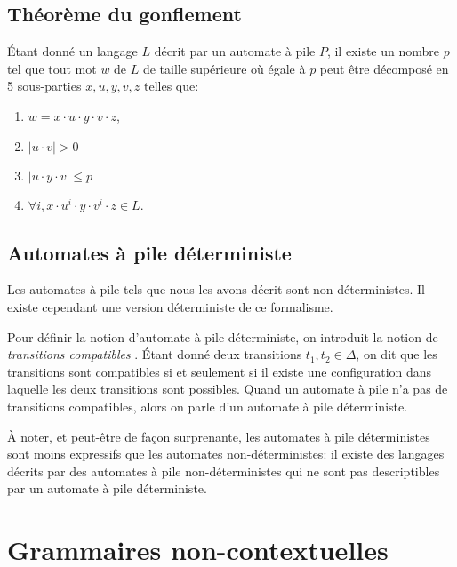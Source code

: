 \subsection{Théorème du gonflement}

Étant donné un langage $L$ décrit par un automate à pile $P$, il existe un nombre $p$ tel que tout mot $w$ de $L$ de taille supérieure où égale à $p$ peut être décomposé en 5 sous-parties $x, u, y, v, z$ telles que:
\begin{enumerate}
\item $w = x \cdot u \cdot y \cdot v \cdot z$,
\item $|u \cdot v| > 0$
\item $|u \cdot y \cdot v| \leq p$
\item $\forall i, x \cdot u^i \cdot y \cdot v^i \cdot z \in L$. 
\end{enumerate}

\subsection{Automates à pile déterministe}

Les automates à pile tels que nous les avons décrit sont non-déterministes.
Il existe cependant une version déterministe de ce formalisme.

Pour définir la notion d'automate à pile déterministe, on introduit la notion de \og \textit{transitions compatibles} \fg{}.
Étant donné deux transitions $t_1, t_2 \in \Delta$, on dit que les transitions sont compatibles si et seulement si il existe une configuration dans laquelle les deux transitions sont possibles.
Quand un automate à pile n'a pas de transitions compatibles, alors on parle d'un automate à pile déterministe.

À noter, et peut-être de façon surprenante, les automates à pile déterministes sont moins expressifs que les automates non-déterministes:
il existe des langages décrits par des automates à pile non-déterministes qui ne
sont pas descriptibles par un automate à pile déterministe.

\section{Grammaires non-contextuelles}

